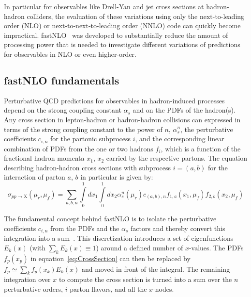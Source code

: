 \documentclass{PoS}
\begin{document}
In particular for observables like Drell-Yan and jet cross sections at
hadron-hadron colliders, the evaluation of these variations using only
the next-to-leading order (NLO) or next-to-next-to-leading order (NNLO)
code can quickly become impractical.
fastNLO~\cite{Britzger:2012bs,Wobisch:2011ij,Kluge:2006xs} was developed
to substantially reduce the amount of processing power that is needed to
investigate different variations of predictions for observables in
NLO or even higher-order.

\subsection{fastNLO fundamentals}

Perturbative QCD predictions for observables in hadron-induced
processes depend on the strong coupling constant $\alpha_s$ and on the
PDFs of the hadron(s). Any cross section in lepton-hadron or
hadron-hadron collisions can expressed in terms of the
strong coupling constant to the power of $n$, $\alpha_s^n$, the
perturbative coefficients $c_{i,n}$ for the partonic subprocess $i$,
and the corresponding linear combination of PDFs from the one or two
hadrons $f_i$, which is a function of the fractional hadron momenta
$x_1$, $x_2$ carried by the respective partons.
The equation describing hadron-hadron cross sections with subprocess $i=(a,b)$
for the interaction of parton $a$, $b$ in particular is given by:
\begin{equation}\label{eq:CrossSection}
  \sigma_{pp\rightarrow\mathrm{X}}(\mu_r,\mu_f) =
  \sum\limits_{a,b,n}\int\limits_0^1dx_1\int\limits_0^1dx_2
    \alpha_s^n(\mu_r) c_{(a,b),n} f_{1,a}(x_1,\mu_f) f_{2,b}(x_2,\mu_f)
\end{equation}

The fundamental concept behind fastNLO is to isolate the perturbative
coefficients $c_{i,n}$ from the PDFs and the $\alpha_s$ factors and thereby
convert this integration into a sum~\cite{Pascaud:1994vx,Wobisch:00}.
This discretization introduces a set of eigenfunctions $E_k(x)$
(with $\sum_k E_k(x) \equiv 1$) around a defined number of $x$-values.
The PDFs $f_p(x_p)$ in equation~\ref{eq:CrossSection} can then be replaced
by $f_p \simeq \sum_k f_p(x_k) E_k(x)$ and moved in front of the integral.
The remaining integration over $x$ to compute the cross section is
turned into a sum over the $n$ perturbative orders, $i$ parton flavors,
and all the $x$-nodes.
\end{document}
